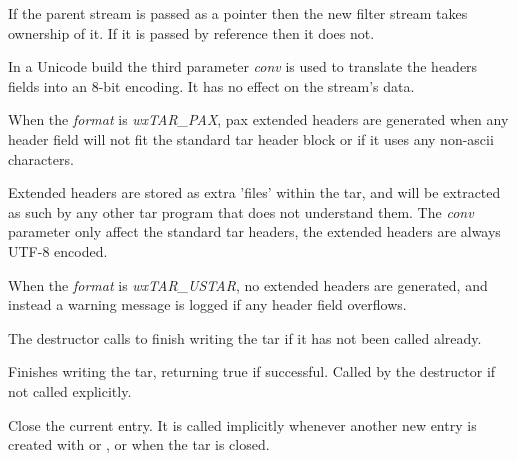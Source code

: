

If the parent stream is passed as a pointer then the new filter stream
takes ownership of it. If it is passed by reference then it does not.

In a Unicode build the third parameter {\it conv} is used to translate the
headers fields into an 8-bit encoding. It has no effect on the stream's data.

When the {\it format} is {\it wxTAR\_PAX}, pax extended headers are generated
when any header field will not fit the standard tar header block or if it
uses any non-ascii characters.

Extended headers are stored as extra 'files' within the tar, and will be
extracted as such by any other tar program that does not understand them.
The {\it conv} parameter only affect the standard tar headers, the extended
headers are always UTF-8 encoded.

When the {\it format} is {\it wxTAR\_USTAR}, no extended headers are
generated, and instead a warning message is logged if any header field
overflows.


\label{wxtaroutputstreamdtor}


The destructor calls  to finish
writing the tar if it has not been called already.


\label{wxtaroutputstreamclose}


Finishes writing the tar, returning true if successful.
Called by the destructor if not called explicitly.


\label{wxtaroutputstreamcloseentry}


Close the current entry. It is called implicitly whenever another new
entry is created with 
or , or
when the tar is closed.



